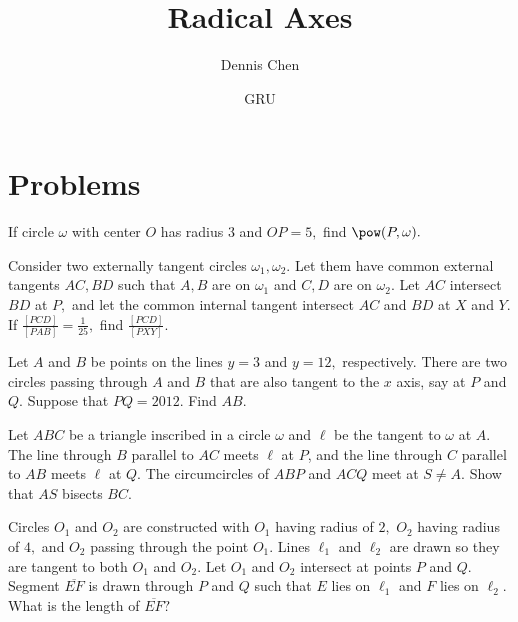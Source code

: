 \documentclass{article}
\title{Radical Axes}
\author{Dennis Chen}
\date{GRU}
\begin{document}
\maketitle



\pagebreak
\section{Problems}


\begin{prob}[]{1}
If circle $\omega$ with center $O$ has radius $3$ and $OP=5,$ find $\pow(P,\omega).$
\end{prob}

\begin{prob}[]{1}
Consider two externally tangent circles $\omega_1,\omega_2.$ Let them have common external tangents $AC,BD$ such that $A,B$ are on $\omega_1$ and $C,D$ are on $\omega_2.$ Let $AC$ intersect $BD$ at $P,$ and let the common internal tangent intersect $AC$ and $BD$ at $X$ and $Y$. If $\frac{[PCD]}{[PAB]}=\frac{1}{25},$ find $\frac{[PCD]}{[PXY]}.$
\end{prob}

\begin{prob}[Mandelbrot 2012]{1}
Let $A$ and $B$ be points on the lines $y=3$ and $y=12,$ respectively. There are two circles passing through $A$ and $B$ that are also tangent to the $x$ axis, say at $P$ and $Q.$ Suppose that $PQ=2012.$ Find $AB.$
\end{prob}

\begin{prob}[HMMT 2020/T3]{2}
Let $ABC$ be a triangle inscribed in a circle $\omega$ and $\ell$ be the tangent to $\omega$ at $A$. The line through $B$ parallel to $AC$ meets $\ell$ at $P$, and the line through $C$ parallel to $AB$ meets $\ell$ at $Q$. The circumcircles of $ABP$ and $ACQ$ meet at $S\neq A$. Show that $AS$ bisects $BC$.
\end{prob}

\begin{prob}{2}
Circles $O_1$ and $O_2$ are constructed with $O_1$ having radius of $2,$ $O_2$ having radius of $4,$ and $O_2$ passing through the point $O_1.$ Lines $\ell_1$ and $\ell_2$ are drawn so they are tangent to both $O_1$ and $O_2.$ Let $O_1$ and $O_2$ intersect at points $P$ and $Q.$ Segment $\overline{EF}$ is drawn through $P$ and $Q$ such that $E$ lies on $\ell_1$ and $F$ lies on $\ell_2.$ What is the length of $\overline{EF}?$
\end{prob}
\end{document}
